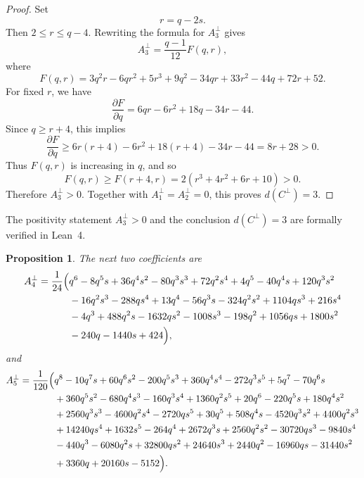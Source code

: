 \documentclass[11pt]{article}
\newtheorem{proposition}[theorem]{Proposition}
\begin{document}
\begin{proof}
Set
\begin{equation}
r=q-2s.
\end{equation}
Then $2\le r\le q-4$. Rewriting the formula for $A_3^{\perp}$ gives
\begin{equation}
A_3^{\perp}=\frac{q-1}{12}F(q,r),
\end{equation}
where
\begin{equation}
F(q,r)=3q^2r-6qr^2+5r^3+9q^2-34qr+33r^2-44q+72r+52.
\end{equation}
For fixed $r$, we have
\begin{equation}
\frac{\partial F}{\partial q}=6qr-6r^2+18q-34r-44.
\end{equation}
Since $q\ge r+4$, this implies
\begin{equation}
\frac{\partial F}{\partial q}
\ge 6r(r+4)-6r^2+18(r+4)-34r-44
=8r+28>0.
\end{equation}
Thus $F(q,r)$ is increasing in $q$, and so
\begin{equation}
F(q,r)\ge F(r+4,r)=2(r^3+4r^2+6r+10)>0.
\end{equation}
Therefore $A_3^{\perp}>0$. Together with $A_1^{\perp}=A_2^{\perp}=0$, this proves $d(C^{\perp})=3$.
\end{proof}

The positivity statement $A_3^{\perp}>0$ and the conclusion $d(C^{\perp})=3$ are formally verified in Lean~4.

\begin{proposition}
The next two coefficients are
\begin{equation}
\begin{aligned}
A_4^{\perp}=\frac1{24}\Bigl(&q^6-8q^5s+36q^4s^2-80q^3s^3+72q^2s^4+4q^5-40q^4s+120q^3s^2 \\
&-16q^2s^3-288qs^4+13q^4-56q^3s-324q^2s^2+1104qs^3+216s^4 \\
&-4q^3+488q^2s-1632qs^2-1008s^3-198q^2+1056qs+1800s^2 \\
&-240q-1440s+424\Bigr),
\end{aligned}
\end{equation}
and
\begin{equation}
\begin{aligned}
A_5^{\perp}=\frac1{120}\Bigl(&q^8-10q^7s+60q^6s^2-200q^5s^3+360q^4s^4-272q^3s^5+5q^7-70q^6s \\
&+360q^5s^2-680q^4s^3-160q^3s^4+1360q^2s^5+20q^6-220q^5s+180q^4s^2 \\
&+2560q^3s^3-4600q^2s^4-2720qs^5+30q^5+508q^4s-4520q^3s^2+4400q^2s^3 \\
&+14240qs^4+1632s^5-264q^4+2672q^3s+2560q^2s^2-30720qs^3-9840s^4 \\
&-440q^3-6080q^2s+32800qs^2+24640s^3+2440q^2-16960qs-31440s^2 \\
&+3360q+20160s-5152\Bigr).
\end{aligned}
\end{equation}
\end{proposition}
\end{document}
